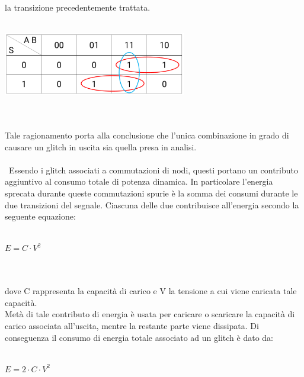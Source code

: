 \documentclass[11pt,  english, makeidx, a4paper, titlepage, oneside]{book}
\begin{document}
la transizione precedentemente trattata. 
\\\\
\centerline{\includegraphics[width=8cm]{./img/Lab_1/Es_4/Mappa_K_supercoperta.png}}
\\\\
Tale ragionamento porta alla conclusione che l'unica combinazione in grado
di causare un glitch in uscita sia quella presa in analisi.
\\\\\
Essendo i glitch associati a commutazioni di nodi, questi portano un 
contributo aggiuntivo al consumo totale di potenza dinamica. In particolare
l'energia sprecata durante queste commutazioni spurie è la somma dei consumi
durante le due transizioni del segnale. Ciascuna delle due contribuisce all'energia secondo la seguente equazione:
\\\\
\centerline{$E = C \cdot V^{2}$}
\\\\
dove C rappresenta la capacità di carico e V la tensione a cui viene caricata
tale capacità.
\\
Metà di tale contributo di energia è usata per caricare o scaricare la
capacità di carico associata all'uscita, mentre la restante parte viene
dissipata.
Di conseguenza il consumo di energia totale associato ad un glitch è 
dato da:
\\\\
\centerline{$E = 2 \cdot C \cdot V^{2}$}
\\\\
\newpage
\end{document}
